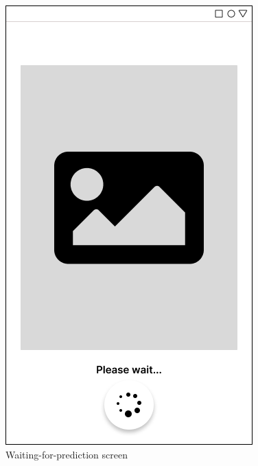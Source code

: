 \documentclass[12pt, a4paper]{article}
\begin{document}
\begin{figure}[h]
    \centering
    \setlength{\fboxsep}{8pt}
    \includegraphics[scale=0.45, fbox]{Waiting.png}
    \caption{Waiting-for-prediction screen}
    \label{fig:waiting}
\end{figure}
\end{document}
